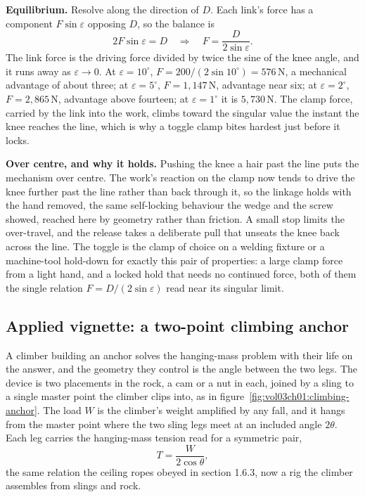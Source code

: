 \textbf{Equilibrium.} Resolve along the direction of $D$. Each link's force has
a component $F\sin\varepsilon$ opposing $D$, so the balance is
\[
2F\sin\varepsilon = D
\quad\Longrightarrow\quad
F = \frac{D}{2\sin\varepsilon}.
\]
The link force is the driving force divided by twice the sine of the knee angle,
and it runs away as $\varepsilon \to 0$. At $\varepsilon = 10^{\circ}$, $F =
200/(2\sin 10^{\circ}) = 576\,\text{N}$, a mechanical advantage of about three;
at $\varepsilon = 5^{\circ}$, $F = 1{,}147\,\text{N}$, advantage near six; at
$\varepsilon = 2^{\circ}$, $F = 2{,}865\,\text{N}$, advantage above fourteen; at
$\varepsilon = 1^{\circ}$ it is $5{,}730\,\text{N}$. The clamp force, carried by
the link into the work, climbs toward the singular value the instant the knee
reaches the line, which is why a toggle clamp bites hardest just before it
locks.

\textbf{Over centre, and why it holds.} Pushing the knee a hair past the line
puts the mechanism over centre. The work's reaction on the clamp now tends to
drive the knee further past the line rather than back through it, so the linkage
holds with the hand removed, the same self-locking behaviour the wedge and the
screw showed, reached here by geometry rather than friction. A small stop limits
the over-travel, and the release takes a deliberate pull that unseats the knee
back across the line. The toggle is the clamp of choice on a welding fixture or
a machine-tool hold-down for exactly this pair of properties: a large clamp
force from a light hand, and a locked hold that needs no continued force, both
of them the single relation $F = D/(2\sin\varepsilon)$ read near its singular
limit.

\subsection{Applied vignette: a two-point climbing anchor}



A climber building an anchor solves the hanging-mass problem with their life on
the answer, and the geometry they control is the angle between the two legs.
The device is two placements in the rock, a cam or a nut in each, joined by a
sling to a single master point the climber clips into, as in
figure~\ref{fig:vol03ch01:climbing-anchor}. The load $W$ is the climber's
weight amplified by any fall, and it hangs from the master point where the two
sling legs meet at an included angle $2\theta$. Each leg carries the
hanging-mass tension read for a symmetric pair,
\[
T = \frac{W}{2\cos\theta},
\]
the same relation the ceiling ropes obeyed in section 1.6.3, now a rig the
climber assembles from slings and rock.


